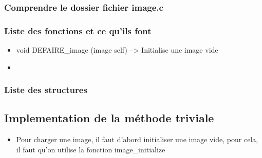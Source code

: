 \documentclass[10pt,a4paper]{article}
\begin{document}
\subsubsection{Comprendre le dossier fichier image.c}
\subsubsection{Liste des fonctions et ce qu'ils font}

\begin{itemize}
\item void DEFAIRE\_image (image self) --> Initialise une image vide
\item 
\end{itemize}
\subsubsection{Liste des structures}
\subsection{Implementation de la méthode triviale}
\begin{itemize}
\item Pour charger une image, il faut d'abord initialiser une image vide, pour cela, il faut qu'on utilise la fonction image\_initialize
\end{itemize}
\end{document}
